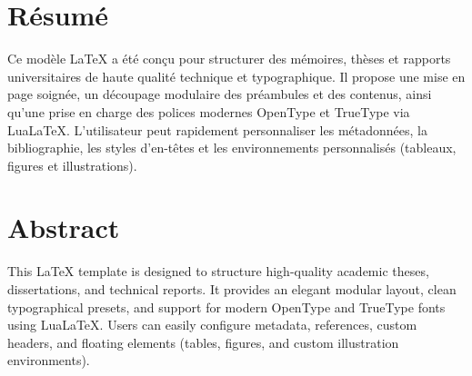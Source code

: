 \chapter*{Résumé}

Ce modèle LaTeX a été conçu pour structurer des mémoires, thèses et rapports universitaires de haute qualité technique et typographique.
Il propose une mise en page soignée, un découpage modulaire des préambules et des contenus, ainsi qu'une prise en charge des polices modernes OpenType et TrueType via LuaLaTeX.
L'utilisateur peut rapidement personnaliser les métadonnées, la bibliographie, les styles d'en-têtes et les environnements personnalisés (tableaux, figures et illustrations).

\vspace{1cm}

\chapter*{Abstract}

This LaTeX template is designed to structure high-quality academic theses, dissertations, and technical reports.
It provides an elegant modular layout, clean typographical presets, and support for modern OpenType and TrueType fonts using LuaLaTeX.
Users can easily configure metadata, references, custom headers, and floating elements (tables, figures, and custom illustration environments).


